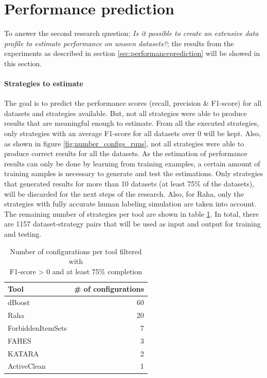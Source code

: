 \newpage
\section{Performance prediction}
To answer the second research question; \textit{Is it possible to create an extensive data profile to estimate performance on
unseen datasets?}; the results from the experiments as described in section \ref{sec:performanceprediction} will be showed in this section. 

\paragraph{Strategies to estimate} The goal is to predict the performance scores (recall, precision \& F1-score) for all datasets and strategies available. But, not all strategies were able to produce results that are meaningful enough to estimate. From all the executed strategies, only strategies with an average F1-score for all datasets over 0 will be kept. Also, as shown in figure \ref{fig:number_configs_runs}, not all strategies were able to produce correct results for all the datasets. As the estimation of performance results can only be done by learning from training examples, a certain amount of training samples is necessary to generate and test the estimations. Only strategies that generated results for more than 10 datasets (at least 75\% of the datasets), will be discarded for the next steps of the research. Also, for Raha, only the strategies with fully accurate human labeling simulation are taken into account. The remaining number of strategies per tool are shown in table \ref{tab:num_configs_per_tool_filtered}. In total, there are 1157 dataset-strategy pairs that will be used as input and output for training and testing. 

\begin{table}
\centering
\begin{tabular}{lr}
\toprule
Tool         &  \# of configurations \\
\midrule
dBoost            &    60 \\
Raha              &    20 \\
ForbiddenItemSets &     7 \\
FAHES             &     3 \\
KATARA            &     2 \\
ActiveClean       &     1 \\
\bottomrule
\end{tabular}
\caption{Number of configurations per tool filtered with \\F1-score > 0 and at least 75\% completion}
\label{tab:num_configs_per_tool_filtered}
\end{table}

